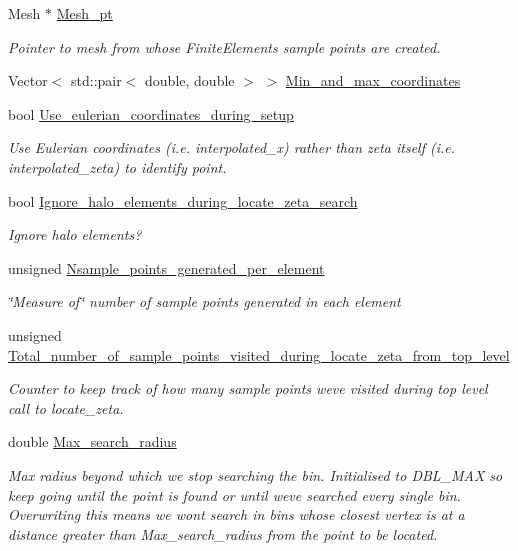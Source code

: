 \begin{DoxyCompactItemize}
\item 
Mesh $\ast$ \hyperlink{classSamplePointContainer_a9f044cf51ea29b0a1a85e029defd81d5}{Mesh\+\_\+pt}
\begin{DoxyCompactList}\small\item\em Pointer to mesh from whose Finite\+Elements sample points are created. \end{DoxyCompactList}\item 
Vector$<$ std\+::pair$<$ double, double $>$ $>$ \hyperlink{classSamplePointContainer_a1607ff8abb3f3b6364bc169a6ea4a79c}{Min\+\_\+and\+\_\+max\+\_\+coordinates}
\item 
bool \hyperlink{classSamplePointContainer_a8d7215f8363d751343efe60a1b051e6a}{Use\+\_\+eulerian\+\_\+coordinates\+\_\+during\+\_\+setup}
\begin{DoxyCompactList}\small\item\em Use Eulerian coordinates (i.\+e. interpolated\+\_\+x) rather than zeta itself (i.\+e. interpolated\+\_\+zeta) to identify point. \end{DoxyCompactList}\item 
bool \hyperlink{classSamplePointContainer_a5b1f32943385600039df3a76b13a216b}{Ignore\+\_\+halo\+\_\+elements\+\_\+during\+\_\+locate\+\_\+zeta\+\_\+search}
\begin{DoxyCompactList}\small\item\em Ignore halo elements? \end{DoxyCompactList}\item 
unsigned \hyperlink{classSamplePointContainer_a849e85891df1b33c5cbe65c8a1f3b4f7}{Nsample\+\_\+points\+\_\+generated\+\_\+per\+\_\+element}
\begin{DoxyCompactList}\small\item\em \char`\"{}\+Measure of\char`\"{} number of sample points generated in each element \end{DoxyCompactList}\item 
unsigned \hyperlink{classSamplePointContainer_a8a2db41f731f23e430bb751e6ea17723}{Total\+\_\+number\+\_\+of\+\_\+sample\+\_\+points\+\_\+visited\+\_\+during\+\_\+locate\+\_\+zeta\+\_\+from\+\_\+top\+\_\+level}
\begin{DoxyCompactList}\small\item\em Counter to keep track of how many sample points we\textquotesingle{}ve visited during top level call to locate\+\_\+zeta. \end{DoxyCompactList}\item 
double \hyperlink{classSamplePointContainer_aae6e7df15b2dbbdf18467716da817f22}{Max\+\_\+search\+\_\+radius}
\begin{DoxyCompactList}\small\item\em Max radius beyond which we stop searching the bin. Initialised to D\+B\+L\+\_\+\+M\+AX so keep going until the point is found or until we\textquotesingle{}ve searched every single bin. Overwriting this means we won\textquotesingle{}t search in bins whose closest vertex is at a distance greater than Max\+\_\+search\+\_\+radius from the point to be located. \end{DoxyCompactList}\end{DoxyCompactItemize}


